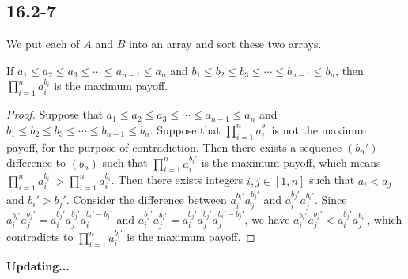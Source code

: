 \subsection*{16.2-7}

We put each of $A$ and $B$ into an array and sort these two arrays.

\begin{claim}
    If $a_1 \leq a_2 \leq a_3 \leq \cdots \leq a_{n-1} \leq a_n$
    and $b_1 \leq b_2 \leq b_3 \leq \cdots \leq b_{n-1} \leq b_n$,
    then $\prod\limits_{i = 1}^n a_i^{b_i}$ is the maximum payoff. 
\end{claim}

\begin{proof}
    Suppose that $a_1 \leq a_2 \leq a_3 \leq \cdots \leq a_{n-1} \leq a_n$
    and $b_1 \leq b_2 \leq b_3 \leq \cdots \leq b_{n-1} \leq b_n$.
    Suppose that $\prod\limits_{i = 1}^n a_i^{b_i}$ is not the maximum payoff, 
    for the purpose of contradiction.
    Then there exists a sequence $(b_n')$ difference to $(b_n)$ such that
    $\prod\limits_{i = 1}^n a_i^{b_i'}$ is the maximum payoff,
    which means $\prod\limits_{i = 1}^n a_i^{b_i'} > \prod\limits_{i = 1}^n a_i^{b_i}$.
    Then there exists integers $i, j \in [1, n]$ such that $a_i < a_j$ and $b_i' > b_j'$.
    Consider the difference between $a_i^{b_i'}a_j^{b_j'}$ and $a_i^{b_j'}a_j^{b_i'}$.
    Since $a_i^{b_i'}a_j^{b_j'} = a_i^{b_j'}a_j^{b_j'}a_i^{b_i' - b_j'}$
    and $a_i^{b_j'}a_j^{b_i'} = a_i^{b_j'}a_j^{b_j'}a_j^{b_i' - b_j'}$,
    we have $a_i^{b_i'}a_j^{b_j'} < a_i^{b_j'}a_j^{b_i'}$,
    which contradicts to $\prod\limits_{i = 1}^n a_i^{b_i'}$ is the maximum payoff.
\end{proof}




\centerline{\textbf{Updating...}}

